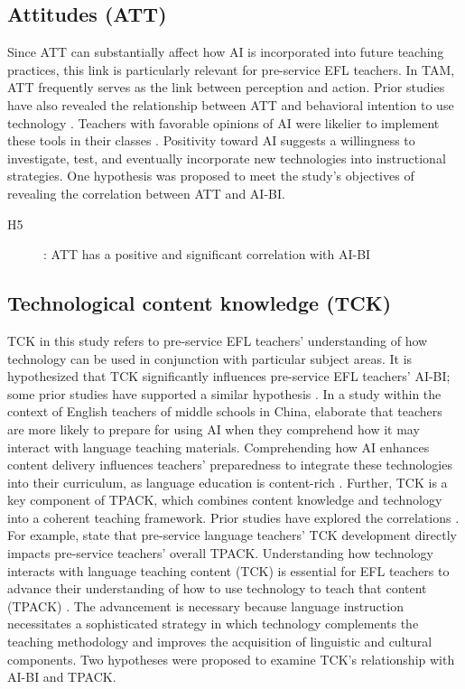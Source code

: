 \documentclass[english]{textolivre}
\begin{document}
\subsection{Attitudes (ATT)}\label{sec-formato}
Since ATT can substantially affect how AI is incorporated into future teaching practices, this link is particularly relevant for pre-service EFL teachers. In TAM, ATT frequently serves as the link between perception and action. Prior studies have also revealed the relationship between ATT and behavioral intention to use technology \cite{allali2024chatgpt,dehghani2024chatgpt,gumbi2024dgb,liu2023chatgpt,ma2024tam,weng2018tam,wu2023aiuse,zou2023speechai}. Teachers with favorable opinions of AI were likelier to implement these tools in their classes \cite{gumbi2024dgb}. Positivity toward AI suggests a willingness to investigate, test, and eventually incorporate new technologies into instructional strategies. One hypothesis was proposed to meet the study's objectives of revealing the correlation between ATT and AI-BI.

\begin{description}
    \item[H5]: ATT has a positive and significant correlation with AI-BI
\end{description}



\subsection{Technological content knowledge (TCK)}\label{sec-modelo}
TCK in this study refers to pre-service EFL teachers’ understanding of how technology can be used in conjunction with particular subject areas. It is hypothesized that TCK significantly influences pre-service EFL teachers’ AI-BI; some prior studies have supported a similar hypothesis \cite{an2023ai,habibi2020tpack,mailizar2021tpack,sofyan2023tpack}. In a study within the context of English teachers of middle schools in China, \textcite{an2023ai} elaborate that teachers are more likely to prepare for using AI when they comprehend how it may interact with language teaching materials. Comprehending how AI enhances content delivery influences teachers’ preparedness to integrate these technologies into their curriculum, as language education is content-rich \cite{habibi2020tpack}. Further, TCK is a key component of TPACK, which combines content knowledge and technology into a coherent teaching framework. Prior studies have explored the correlations \cite{an2023ai,habibi2020tpack,mailizar2021tpack,mansour2024stem,sofyan2023tpack}. For example, \textcite{habibi2020tpack} state that pre-service language teachers’ TCK development directly impacts pre-service teachers’ overall TPACK. Understanding how technology interacts with language teaching content (TCK) is essential for EFL teachers to advance their understanding of how to use technology to teach that content (TPACK) \cite{an2023ai}. The advancement is necessary because language instruction necessitates a sophisticated strategy in which technology complements the teaching methodology and improves the acquisition of linguistic and cultural components. Two hypotheses were proposed to examine TCK’s relationship with AI-BI and TPACK. 
\end{document}
